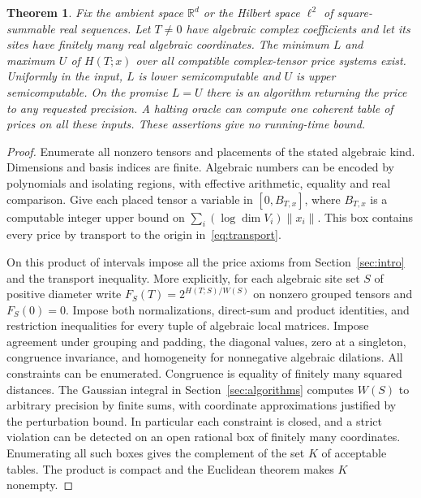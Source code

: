 \documentclass[11pt,letterpaper]{article}
\newtheorem{theorem}{Theorem}[section]
\theoremstyle{definition}
\newcommand{\R}{\mathbb R}
\newcommand{\norm}[1]{\lVert#1\rVert}
\begin{document}
\begin{theorem}\label{thm:computability}
Fix the ambient space \(\R^d\) or the Hilbert space \(\ell^2\) of
square-summable real sequences.
Let \(T\ne0\) have algebraic complex coefficients and let its sites have
finitely many real algebraic coordinates. The minimum \(L\) and maximum
\(U\) of \(H(T;x)\) over all compatible complex-tensor price systems exist.
Uniformly in the input, \(L\) is lower semicomputable and \(U\) is upper
semicomputable. On the promise \(L=U\) there is an algorithm returning
the price to any requested precision. A halting oracle can compute one
coherent table of prices on all these inputs. These assertions give no
running-time bound.
\end{theorem}
\begin{proof}
Enumerate all nonzero tensors and placements of the stated algebraic
kind. Dimensions and basis indices are finite. Algebraic numbers can be
encoded by polynomials and isolating regions, with effective arithmetic,
equality and real comparison. Give each placed tensor a variable in
\([0,B_{T,x}]\), where \(B_{T,x}\) is a computable integer upper bound
on \(\sum_i(\log\dim V_i)\norm{x_i}\). This box contains every price by
transport to the origin in~\eqref{eq:transport}.

On this product of intervals impose all the price axioms from
Section~\ref{sec:intro} and the transport inequality. More explicitly,
for each algebraic site set \(S\) of positive diameter write
\(F_S(T)=2^{H(T;S)/W(S)}\) on nonzero grouped tensors and \(F_S(0)=0\).
Impose both normalizations, direct-sum and product identities, and
restriction inequalities for every tuple of algebraic local matrices.
Impose agreement under grouping and padding, the diagonal values,
zero at a singleton, congruence invariance, and homogeneity for
nonnegative algebraic dilations. All constraints can be enumerated.
Congruence is equality of finitely many squared distances. The Gaussian
integral in Section~\ref{sec:algorithms} computes \(W(S)\) to arbitrary
precision by finite sums, with coordinate approximations justified by
the perturbation bound. In particular each constraint is closed, and
a strict violation can be detected on an open rational box of finitely
many coordinates. Enumerating all such boxes gives the complement of
the set \(K\) of acceptable tables. The product is compact and the
Euclidean theorem makes \(K\) nonempty.


\end{proof}
\end{document}
